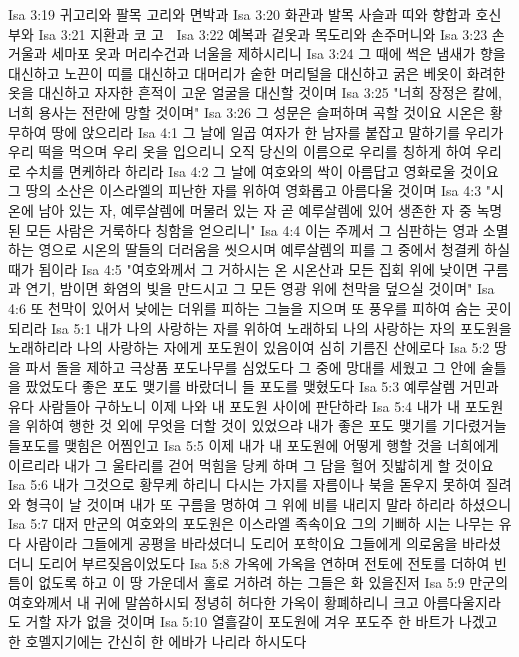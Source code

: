 Isa 3:19  귀고리와 팔목 고리와 면박과
Isa 3:20  화관과 발목 사슬과 띠와 향합과 호신부와
Isa 3:21  지환과 코 고리̙
Isa 3:22  예복과 겉옷과 목도리와 손주머니와
Isa 3:23  손 거울과 세마포 옷과 머리수건과 너울을 제하시리니
Isa 3:24  그 때에 썩은 냄새가 향을 대신하고 노끈이 띠를 대신하고 대머리가 숱한 머리털을 대신하고 굵은 베옷이 화려한 옷을 대신하고 자자한 흔적이 고운 얼굴을 대신할 것이며
Isa 3:25  "너희 장정은 칼에, 너희 용사는 전란에 망할 것이며"
Isa 3:26  그 성문은 슬퍼하며 곡할 것이요 시온은 황무하여 땅에 앉으리라
Isa 4:1  그 날에 일곱 여자가 한 남자를 붙잡고 말하기를 우리가 우리 떡을 먹으며 우리 옷을 입으리니 오직 당신의 이름으로 우리를 칭하게 하여 우리로 수치를 면케하라 하리라
Isa 4:2  그 날에 여호와의 싹이 아름답고 영화로울 것이요 그 땅의 소산은 이스라엘의 피난한 자를 위하여 영화롭고 아름다울 것이며
Isa 4:3  "시온에 남아 있는 자, 예루살렘에 머물러 있는 자 곧 예루살렘에 있어 생존한 자 중 녹명된 모든 사람은 거룩하다 칭함을 얻으리니"
Isa 4:4  이는 주께서 그 심판하는 영과 소멸하는 영으로 시온의 딸들의 더러움을 씻으시며 예루살렘의 피를 그 중에서 청결케 하실 때가 됨이라
Isa 4:5  "여호와께서 그 거하시는 온 시온산과 모든 집회 위에 낮이면 구름과 연기, 밤이면 화염의 빛을 만드시고 그 모든 영광 위에 천막을 덮으실 것이며"
Isa 4:6  또 천막이 있어서 낮에는 더위를 피하는 그늘을 지으며 또 풍우를 피하여 숨는 곳이 되리라
Isa 5:1  내가 나의 사랑하는 자를 위하여 노래하되 나의 사랑하는 자의 포도원을 노래하리라 나의 사랑하는 자에게 포도원이 있음이여 심히 기름진 산에로다
Isa 5:2  땅을 파서 돌을 제하고 극상품 포도나무를 심었도다 그 중에 망대를 세웠고 그 안에 술틀을 팠었도다 좋은 포도 맺기를 바랐더니 들 포도를 맺혔도다
Isa 5:3  예루살렘 거민과 유다 사람들아 구하노니 이제 나와 내 포도원 사이에 판단하라
Isa 5:4  내가 내 포도원을 위하여 행한 것 외에 무엇을 더할 것이 있었으랴 내가 좋은 포도 맺기를 기다렸거늘 들포도를 맺힘은 어찜인고
Isa 5:5  이제 내가 내 포도원에 어떻게 행할 것을 너희에게 이르리라 내가 그 울타리를 걷어 먹힘을 당케 하며 그 담을 헐어 짓밟히게 할 것이요
Isa 5:6  내가 그것으로 황무케 하리니 다시는 가지를 자름이나 북을 돋우지 못하여 질려와 형극이 날 것이며 내가 또 구름을 명하여 그 위에 비를 내리지 말라 하리라 하셨으니
Isa 5:7  대저 만군의 여호와의 포도원은 이스라엘 족속이요 그의 기뻐하 시는 나무는 유다 사람이라 그들에게 공평을 바라셨더니 도리어 포학이요 그들에게 의로움을 바라셨더니 도리어 부르짖음이었도다
Isa 5:8  가옥에 가옥을 연하며 전토에 전토를 더하여 빈 틈이 없도록 하고 이 땅 가운데서 홀로 거하려 하는 그들은 화 있을진저
Isa 5:9  만군의 여호와께서 내 귀에 말씀하시되 정녕히 허다한 가옥이 황폐하리니 크고 아름다울지라도 거할 자가 없을 것이며
Isa 5:10  열흘갈이 포도원에 겨우 포도주 한 바트가 나겠고 한 호멜지기에는 간신히 한 에바가 나리라 하시도다

